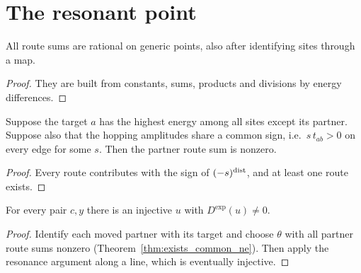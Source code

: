 \section{The resonant point}

\begin{lemma}
  \label{lem:ratOn_routes}
  \leanok
  All route sums are rational on generic points, also after identifying sites through a map.
\end{lemma}
\begin{proof}
  \leanok
  They are built from constants, sums, products and divisions by energy differences.
\end{proof}

\begin{theorem}
  \label{thm:Lval_ne_zero}
  \leanok
  Suppose the target $a$ has the highest energy among all sites except its partner. Suppose also that the
  hopping amplitudes share a common sign, i.e.\ $s\,t_{ab}>0$ on every edge for some $s$. Then the partner
  route sum is nonzero.
\end{theorem}
\begin{proof}
  \leanok
  Every route contributes with the sign of $(-s)^{\operatorname{dist}}$, and at least one route exists.
\end{proof}

\begin{theorem}
  \label{thm:exists_DExp_ne}
  \leanok
  For every pair $c,y$ there is an injective $u$ with $D^{\exp}(u)\ne0$.
\end{theorem}
\begin{proof}
  \leanok
  Identify each moved partner with its target and choose $\theta$ with all partner route sums nonzero
  (Theorem~\ref{thm:exists_common_ne}). Then apply the resonance argument along a line, which is eventually
  injective.
\end{proof}
